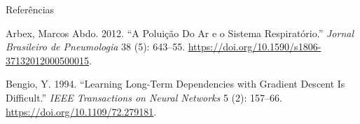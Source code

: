 \documentclass[
  ignorenonframetext,
]{beamer}
\newlength{\cslhangindent}
\newenvironment{CSLReferences}[2] %
 {\begin{list}{}{%
  \setlength{\itemindent}{0pt}
  \setlength{\leftmargin}{0pt}
  \setlength{\parsep}{0pt}
  \ifodd #1
   \setlength{\leftmargin}{\cslhangindent}
   \setlength{\itemindent}{-1\cslhangindent}
  \fi
  \setlength{\itemsep}{#2\baselineskip}}}
 {\end{list}}
\begin{document}
\begin{frame}{Referências}
\label{referuxeancias}
\label{refs}
\begin{CSLReferences}{1}{0}
Arbex, Marcos Abdo. 2012. {``A Poluição Do Ar e o Sistema
Respiratório.''} \emph{Jornal Brasileiro de Pneumologia} 38 (5):
643--55. \url{https://doi.org/10.1590/s1806-37132012000500015}.

Bengio, Y. 1994. {``Learning Long-Term Dependencies with Gradient
Descent Is Difficult.''} \emph{IEEE Transactions on Neural Networks} 5
(2): 157--66. \url{https://doi.org/10.1109/72.279181}.

\end{CSLReferences}
\end{frame}
\end{document}
